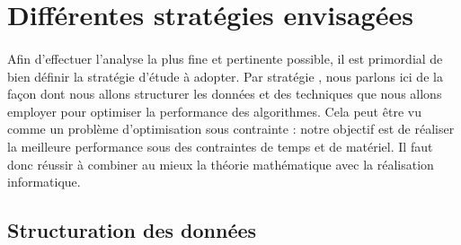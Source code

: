 \documentclass[14pt, openany]{article}
\begin{document}
\section{Différentes stratégies envisagées}
\paragraph{}
Afin d'effectuer l'analyse la plus fine et pertinente possible, il est primordial de bien définir la stratégie d'étude à adopter. Par \og stratégie \fg{}, nous parlons ici de la façon dont nous allons structurer les données et des techniques que nous allons employer pour optimiser la performance des algorithmes. Cela peut être vu comme un problème d'optimisation sous contrainte : notre objectif est de réaliser la meilleure performance sous des contraintes de temps et de matériel. Il faut donc réussir à combiner au mieux la théorie mathématique avec la réalisation informatique.

\subsection{Structuration des données}
\end{document}
